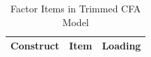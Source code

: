 \begin{table}
	\scriptsize
	\centering
	\begin{threeparttable}
	\caption {Factor Items in Trimmed CFA Model}\label{tab:cfa}
	\begin{tabular}{l|l|l}
		\hline
		Construct                                                                            & Item                                                                                                                                                                                                                                                                                                                                                                                                                                                                                                                                                                                                                                                                                                                                                                          & Loading                                                                                                                                           \\ \hline

\end{tabular}
\end{threeparttable}
\end{table}
